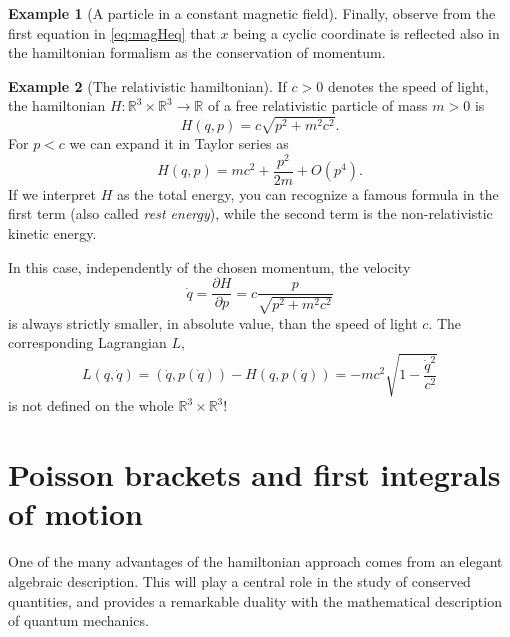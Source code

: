 \documentclass[english,fontsize=11pt,paper=b5]{scrbook}
\numberwithin{equation}{chapter}
\theoremstyle{definition}
\newtheorem{example}{Example}[chapter]
\begin{document}
\begin{example}[A particle in a constant magnetic field]
      Finally, observe from the first equation in \eqref{eq:magHeq} that $x$ being a cyclic coordinate is reflected also in the hamiltonian formalism as the conservation of momentum.
    \end{example}

    \begin{example}[The relativistic hamiltonian]
      If $c>0$ denotes the speed of light, the hamiltonian $H:\mathbb{R}^3\times\mathbb{R}^3\to\mathbb{R}$ of a free relativistic particle of mass $m>0$ is
      \begin{equation}
        H(q,p) = c \sqrt{p^2 + m^2 c^2}.
      \end{equation}
      For $p < c$ we can expand it in Taylor series as
      \begin{equation}
        H(q,p) = mc^2 + \frac{p^2}{2m} + O(p^4).
      \end{equation}
      If we interpret $H$ as the total energy, you can recognize a famous formula in the first term (also called \emph{rest energy}), while the second term is the non-relativistic kinetic energy.

      In this case, independently of the chosen momentum, the velocity
      \begin{equation}
        \dot q = \frac{\partial H}{\partial p} = c \frac{p}{\sqrt{p^2 + m^2 c^2}}
      \end{equation}
      is always strictly smaller, in absolute value, than the speed of light $c$.
      The corresponding Lagrangian $L$,
      \begin{equation}
        L(q,\dot q) = (\dot q, p(\dot q)) - H(q, p(\dot q)) = -mc^2 \sqrt{1-\frac{\dot q^2}{c^2}}
      \end{equation}
      is not defined on the whole $\mathbb{R}^3\times\mathbb{R}^3$!
    \end{example}

    \section{Poisson brackets and first integrals of motion}\label{sec:poisson}

    One of the many advantages of the hamiltonian approach comes from an elegant algebraic description.
    This will play a central role in the study of conserved quantities, and provides a remarkable duality with the mathematical description of quantum mechanics.
\end{document}
